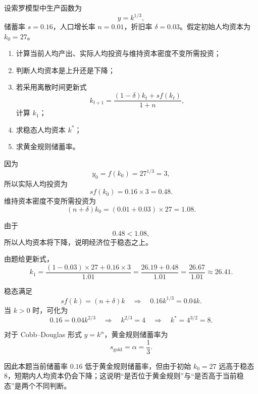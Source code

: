 \begin{question}
设索罗模型中生产函数为
\[
y=k^{1/3},
\]
储蓄率 $s=0.16$，人口增长率 $n=0.01$，折旧率 $\delta=0.03$。假定初始人均资本为 $k_0=27$。

\begin{enumerate}[label=(\arabic*),leftmargin=2.5em]
  \item 计算当前人均产出、实际人均投资与维持资本密度不变所需投资；
  \item 判断人均资本是上升还是下降；
  \item 若采用离散时间更新式
  \[
  k_{t+1}=\frac{(1-\delta)k_t+s f(k_t)}{1+n},
  \]
  计算 $k_1$；
  \item 求稳态人均资本 $k^*$；
  \item 求黄金规则储蓄率。
\end{enumerate}

\begin{solution}
因为
\[
y_0=f(k_0)=27^{1/3}=3,
\]
所以实际人均投资为
\[
s f(k_0)=0.16\times 3=0.48.
\]
维持资本密度不变所需投资为
\[
(n+\delta)k_0=(0.01+0.03)\times 27=1.08.
\]

由于
\[
0.48<1.08,
\]
所以人均资本将下降，说明经济位于稳态之上。

由题给更新式，
\[
k_1=\frac{(1-0.03)\times 27+0.16\times 3}{1.01}
=\frac{26.19+0.48}{1.01}
=\frac{26.67}{1.01}\approx 26.41.
\]

稳态满足
\[
s f(k)=(n+\delta)k
\quad\Longrightarrow\quad
0.16k^{1/3}=0.04k.
\]
当 $k>0$ 时，可化为
\[
0.16=0.04k^{2/3}
\quad\Longrightarrow\quad
k^{2/3}=4
\quad\Longrightarrow\quad
k^*=4^{3/2}=8.
\]

对于 Cobb--Douglas 形式 $y=k^\alpha$，黄金规则储蓄率为
\[
s_{\text{gold}}=\alpha=\frac13.
\]

因此本题当前储蓄率 $0.16$ 低于黄金规则储蓄率，但由于初始 $k_0=27$ 远高于稳态 $8$，短期内人均资本仍会下降；这说明“是否位于黄金规则”与“是否高于当前稳态”是两个不同判断。
\end{solution}
\end{question}

